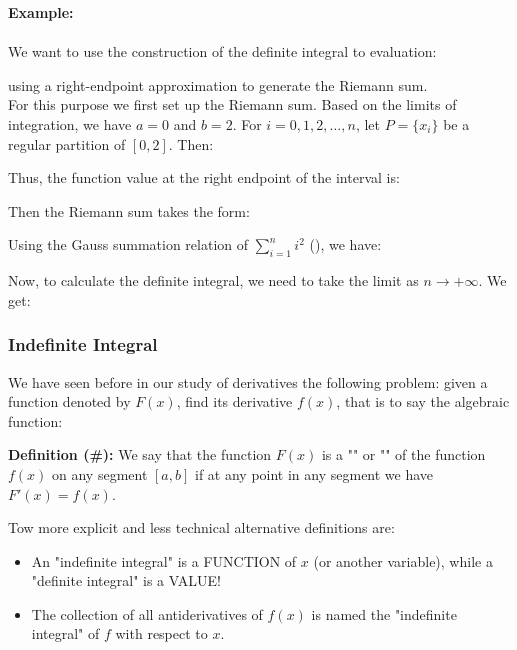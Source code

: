 	\begin{tcolorbox}[colframe=black,colback=white,sharp corners]
	\textbf{{\Large {}}Example:}\\\\
	We want to use the construction of the definite integral to evaluation:
	
	using a right-endpoint approximation to generate the Riemann sum.\\
	
	For this purpose we first set up the Riemann sum. Based on the limits of integration, we have $a=0$ and $b=2$. For $i=0,1,2,\ldots,n$, let $P=\{x_i\}$ be a regular partition of $[0,2]$. Then:
	
	Thus, the function value at the right endpoint of the interval is:
	
	Then the Riemann sum takes the form:
	
	Using the Gauss summation relation of $\sum_{i=1}^n i^2$ (), we have:
	
	Now, to calculate the definite integral, we need to take the limit as $n\rightarrow+\infty$. We get:
	 
	\end{tcolorbox}
	
	\subsubsection{Indefinite Integral}
	We have seen before in our study of derivatives the following problem: given a function denoted by $F(x)$, find its derivative $f(x)$, that is to say the algebraic function:
	
	\textbf{Definition (\#\mydef):} We say that the function $F (x)$ is a "" or "" of the function $f (x)$ on any segment $[a, b]$ if at any point in any segment we have $F'(x)=f(x)$.
	
	Tow more explicit and less technical alternative definitions are: 
	\begin{itemize}
		\item An "indefinite integral" is a FUNCTION of $x$ (or another variable), while a "definite integral" is a VALUE!
		
		\item The collection of all antiderivatives of $f(x)$ is named the "indefinite integral" of $f$ with respect to $x$.
	\end{itemize}

